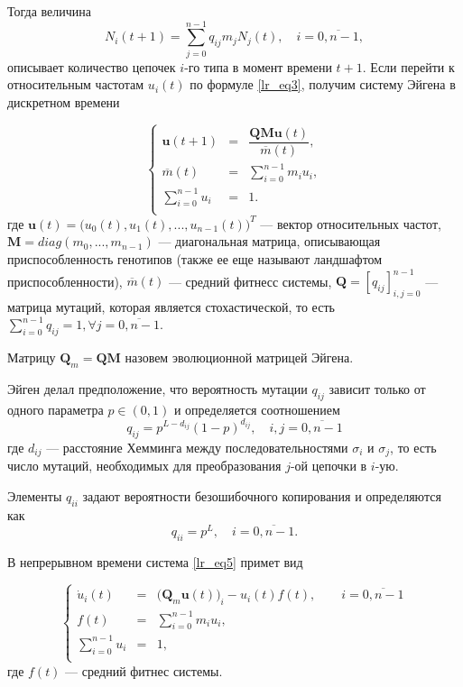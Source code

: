 Тогда величина
$$
N_{i}(t + 1) = \sum\limits_{j = 0}^{n - 1}q_{ij}m_{j}N_{j}(t), \quad i = \overline{0, n - 1},
$$
описывает количество цепочек $i$-го типа в момент времени $t + 1$. Если перейти к относительным частотам $u_{i}(t)$ по формуле \eqref{lr_eq3}, получим систему Эйгена в дискретном времени

\begin{equation}
\left\{
\begin{array}{rcl}
\mathbf{u}(t + 1) & = & \dfrac{\mathbf{QMu}(t)}{\overline{m}(t)},\\
\overline{m}(t) & = & \sum\limits_{i = 0}^{n - 1}m_{i}u_{i},\\
\sum\limits_{i = 0}^{n - 1} u_{i} & = & 1.\\ 
\end{array}
\right.
\label{lr_eq5}
\end{equation}
где $\mathbf{u}(t) = \Big(u_{0}(t), u_{1}(t), ..., u_{n - 1}(t)\Big)^{T}$ --- вектор относительных частот, $\mathbf{M} = diag(m_{0}, ..., m_{n - 1})$ --- диагональная матрица, описывающая приспособленность генотипов (также ее еще называют ландшафтом приспособленности), $\overline{m}(t)$ --- средний фитнесс системы, $\mathbf{Q} = [q_{ij}]_{i, j = 0}^{n - 1}$ --- матрица мутаций, которая является стохастической, то есть $\sum\limits_{i = 0}^{n - 1}q_{ij} = 1, \forall j = \overline{0, n - 1}$.

Матрицу $\mathbf{Q}_{m}= \mathbf{QM}$ назовем эволюционной матрицей Эйгена.

Эйген делал предположение, что вероятность мутации $q_{ij}$ зависит только от одного параметра $p \in (0, 1)$ и определяется соотношением
$$
q_{ij} = p^{L - d_{ij}}(1 - p)^{d_{ij}}, \quad i,j = \overline{0, n - 1}
$$
где $d_{ij}$ --- расстояние Хемминга между последовательностями $\sigma_{i}$ и $\sigma_{j}$, то есть число мутаций, необходимых для преобразования $j$-ой цепочки в $i$-ую.

Элементы $q_{ii}$ задают вероятности безошибочного копирования и определяются как
$$
q_{ii} = p^{L}, \quad i = \overline{0, n - 1}.
$$

В непрерывном времени система \eqref{lr_eq5} примет вид

\begin{equation}
\left\{
\begin{array}{rcl}
\dot{u}_{i}(t) & = & \Big(\mathbf{Q}_{m}\mathbf{u}(t)\Big)_{i} - u_{i}(t)f(t), \qquad i = \overline{0, n - 1}\\
f(t) & = & \sum\limits_{i = 0}^{n - 1} m_{i}u_{i},\\
\sum\limits_{i = 0}^{n - 1} u_{i} & = & 1,\\ 
\end{array}
\right.
\label{lr_eq6}
\end{equation}
где $f(t)$ --- средний фитнес системы.

